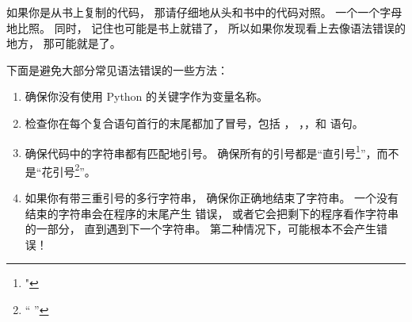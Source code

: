 如果你是从书上复制的代码， 那请仔细地从头和书中的代码对照。
一个一个字母地比照。
同时， 记住也可能是书上就错了， 所以如果你发现看上去像语法错误的地方， 那可能就是了。


下面是避免大部分常见语法错误的一些方法：

\begin{enumerate}


\item 确保你没有使用 Python 的关键字作为变量名称。


\item 检查你在每个复合语句首行的末尾都加了冒号，包括 ， ，，和  语句。


\item 确保代码中的字符串都有匹配地引号。  确保所有的引号都是``直引号\footnote{" }''，而不是``花引号\footnote{“ ”}''。


\item 如果你有带三重引号的多行字符串， 确保你正确地结束了字符串。
一个没有结束的字符串会在程序的末尾产生  错误， 或者它会把剩下的程序看作字符串的一部分， 直到遇到下一个字符串。
第二种情况下，可能根本不会产生错误！


\end{enumerate}
